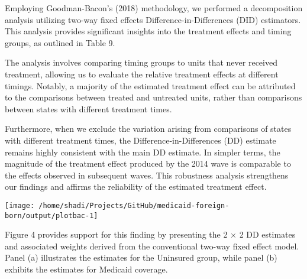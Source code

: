 \documentclass[
]{article}
\let\origtable\table
\let\endorigtable\endtable
\renewenvironment{table}[1][ht]{
      \expandafter\origtable\expandafter[H]
    }{
      \endorigtable
    }
\begin{document}
Employing Goodman-Bacon's (2018) methodology, we performed a
decomposition analysis utilizing two-way fixed effects
Difference-in-Differences (DID) estimators. This analysis provides
significant insights into the treatment effects and timing groups, as
outlined in Table 9.

\begin{table}

\caption{\label{tab:tab9}Bacon Decomposition}
\centering
{}
\end{table}

The analysis involves comparing timing groups to units that never
received treatment, allowing us to evaluate the relative treatment
effects at different timings. Notably, a majority of the estimated
treatment effect can be attributed to the comparisons between treated
and untreated units, rather than comparisons between states with
different treatment times.

Furthermore, when we exclude the variation arising from comparisons of
states with different treatment times, the Difference-in-Differences
(DD) estimate remains highly consistent with the main DD estimate. In
simpler terms, the magnitude of the treatment effect produced by the
2014 wave is comparable to the effects observed in subsequent waves.
This robustness analysis strengthens our findings and affirms the
reliability of the estimated treatment effect.

\begin{center}\texttt{[image: /home/shadi/Projects/GitHub/medicaid-foreign-born/output/plotbac-1]} \end{center}

Figure 4 provides support for this finding by presenting the 2 × 2 DD
estimates and associated weights derived from the conventional two-way
fixed effect model. Panel (a) illustrates the estimates for the
Uninsured group, while panel (b) exhibits the estimates for Medicaid
coverage.
\end{document}
